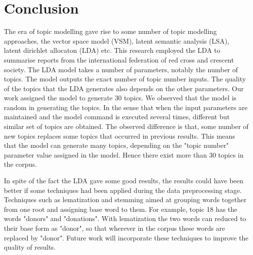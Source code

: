 \chapter{Conclusion}
\begin{flushleft}
The era of topic modelling gave rise to some number of topic modelling approaches, the vector space model (VSM), latent semantic analysis (LSA), latent dirichlet allocaton (LDA) etc. This research employed the LDA to summarise reports from the international federation of red cross and crescent society. The LDA model takes a number of parameters, notably the number of topics. The model outputs the exact number of topic number inputs. The quality of the topics that the LDA generates also depends on the other parameters. Our work assigned the model to generate 30 topics. We observed that the model is random in generating the topics. In the sense that when the input parameters are maintained and the model command is executed several times, different but similar set of topics are obtained. The observed difference is that, some number of new topics replaces some topics that occurred in previous results. This means that the model can generate  many topics, depending on the "topic number" parameter value assigned in the model. Hence there exist more than 30 topics in the corpus.
\end{flushleft}
\begin{flushleft}
In spite of the fact the LDA gave some good results, the results could have been better if some techniques had been applied during the data preprocessing stage. Techniques such as lematization and stemming aimed at grouping words together from one root and assigning base word to them. For example, topic 18 has the words "donors" and "donations". With lematization the two words can reduced to their base form as "donor", so that wherever in the corpus these words are replaced by "donor".  
Future work will incorporate these techniques to improve the quality of results.
\end{flushleft}